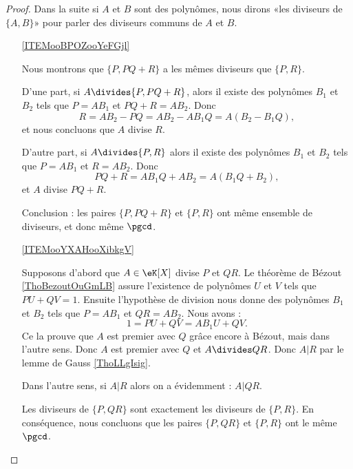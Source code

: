 \begin{proof}
    Dans la suite si \( A\) et \( B\) sont des polynômes, nous dirons «les diviseurs de \( \{ A,B \}\)» pour parler des diviseurs communs de \( A\) et \( B\).

    \begin{enumerate}
        \item[\ref{ITEMooBPOZooYeFGjl}]
            
    Nous montrons que \( \{ P,PQ+R \}\) a les mêmes diviseurs que \( \{ P,R \}\).

    D'une part, si \( A\divides\{ P,PQ+R \}\), alors il existe des polynômes \( B_1\) et \( B_2\) tels que \( P=AB_1\) et \( PQ+R=AB_2\). Donc
            \begin{equation}
                R=AB_2-PQ=AB_2-AB_1Q=A(B_2-B_1Q),
            \end{equation}
            et nous concluons que \( A\) divise \( R\).

            D'autre part, si \( A\divides\{ P,R \}\) alors il existe des polynômes \( B_1\) et \( B_2\) tels que \( P=AB_1\) et \( R=AB_2\). Donc
            \begin{equation}
                PQ+R=AB_1Q+AB_2=A(B_1Q+B_2),
            \end{equation}
            et \( A\) divise \( PQ+R\).

            Conclusion : les paires \( \{ P,PQ+R \}\) et \( \{ P,R \}\) ont même ensemble de diviseurs, et donc même \( \pgcd\).

\item[\ref{ITEMooYXAHooXibkgV}]

Supposons d'abord que \( A\in \eK[X]\) divise \( P\) et \( QR\). Le théorème de Bézout \ref{ThoBezoutOuGmLB} assure l'existence de polynômes $U$ et $V$ tels que $PU+QV=1$. Ensuite l'hypothèse de division nous donne des polynômes \( B_1\) et \( B_2\) tels que $P=AB_1$ et $QR=AB_2$.  Nous avons :
            \begin{equation}
                    1=PU+QV=AB_1U+QV.
            \end{equation}
            Ce la prouve que \( A\) est premier avec $Q$ grâce encore à Bézout, mais dans l'autre sens. Donc \( A\) est premier avec \( Q\) et \( A\divides QR\). Donc \( A|R\) par le lemme de Gauss \ref{ThoLLgIsig}.
                   
    Dans l'autre sens, si $A|R$ alors on a évidemment : $A|QR$.

    Les diviseurs de $\{P,QR\}$ sont exactement les diviseurs de $\{P,R\}$. En conséquence, nous concluons que les paires $\{P,QR\}$ et $\{P,R\}$ ont le même $\pgcd$.

    \end{enumerate}

\end{proof}

